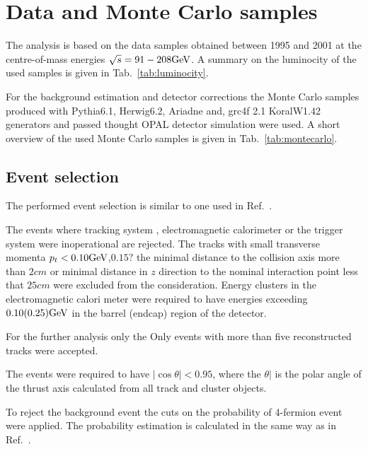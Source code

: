 \section{Data and Monte Carlo samples}
\label{sec:selection}
The analysis is based on the data samples obtained between 1995 and 2001 
at the centre-of-mass energies $\sqrt{s}=91-208{\text{Ge}\kern-0.06667em\text{V\/}}$. A summary on the luminocity
of the used samples is given in Tab.~\ref{tab:luminocity}.





For the background estimation and detector corrections the Monte Carlo samples 
produced with Pythia6.1, Herwig6.2, Ariadne and, grc4f 2.1  KoralW1.42~\cite{Skrzypek:1995wd} generators 
and passed thought OPAL detector simulation were used.
A short overview of the used Monte Carlo samples is given in Tab.~\ref{tab:montecarlo}.
\TABmontecarlo


\subsection{Event selection}
\label{sec:selection}
The performed event selection is similar to one used in Ref.~\cite{}.

The events where tracking system , electromagnetic calorimeter or the trigger system were inoperational are rejected.
The tracks with small transverse momenta $p_t<0.10{\text{Ge}\kern-0.06667em\text{V\/}}$,{\bf $0.15?$} the minimal  distance to the 
collision axis more than $2cm$ or minimal distance in $z$ direction to the nominal interaction point less that $25cm$
were excluded from the consideration. 
Energy clusters in the electromagnetic calori
meter were required to have energies exceeding $0.10(0.25) {\text{Ge}\kern-0.06667em\text{V\/}}$ in 
the barrel (endcap) region of the detector.


For the further analysis only the
Only events with more than five reconstructed tracks were accepted.

The events were required to have $|\cos\theta|<0.95$, where the  
$\theta|$ is the polar angle of the thrust axis calculated from all track
and cluster objects.

To reject the background event the cuts on the probability of 4-fermion event were applied.
The probability estimation is  calculated in the same way as in Ref.~\cite{Abbiendi:2000eg}.






